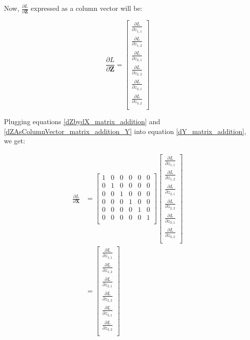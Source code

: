 \documentclass{article}
\newcommand{\matr}[1]{\mathbf{#1}} %
\begin{document}
Now, $\frac{\partial L}{\partial \matr{Z}}$ expressed as a column vector will be:

\begin{equation} \label{dZAsColumnVector_matrix_addition_Y}
\frac{\partial L}{\partial \matr{Z}} =
\begin{bmatrix}
\frac{\partial L}{\partial z_{1,1}} \\[0.7em]
\frac{\partial L}{\partial z_{1,2}} \\[0.7em]
\frac{\partial L}{\partial z_{2,1}} \\[0.7em]
\frac{\partial L}{\partial z_{2,2}} \\[0.7em]
\frac{\partial L}{\partial z_{3,1}} \\[0.7em]
\frac{\partial L}{\partial z_{3,2}} \\[0.7em]
\end{bmatrix}
\end{equation}

Plugging equations \ref{dZbydX_matrix_addition} and \ref{dZAsColumnVector_matrix_addition_Y} into equation \ref{dY_matrix_addition}, we get:

\begin{align}
\frac{\partial L}{\partial \matr{X}} &=
\begin{bmatrix}
1 & 0 & 0 & 0 & 0 & 0 \\%
0 & 1 & 0 & 0 & 0 & 0 \\%
0 & 0 & 1 & 0 & 0 & 0 \\%
0 & 0 & 0 & 1 & 0 & 0 \\%
0 & 0 & 0 & 0 & 1 & 0 \\%
0 & 0 & 0 & 0 & 0 & 1 \\%
\end{bmatrix}
\begin{bmatrix}
\frac{\partial L}{\partial z_{1,1}} \\[0.7em]
\frac{\partial L}{\partial z_{1,2}} \\[0.7em]
\frac{\partial L}{\partial z_{2,1}} \\[0.7em]
\frac{\partial L}{\partial z_{2,2}} \\[0.7em]
\frac{\partial L}{\partial z_{3,1}} \\[0.7em]
\frac{\partial L}{\partial z_{3,2}} \\[0.7em]
\end{bmatrix}
\nonumber \\
&=
\begin{bmatrix}
\frac{\partial L}{\partial z_{1,1}} \\[0.7em]
\frac{\partial L}{\partial z_{1,2}} \\[0.7em]
\frac{\partial L}{\partial z_{2,1}} \\[0.7em]
\frac{\partial L}{\partial z_{2,2}} \\[0.7em]
\frac{\partial L}{\partial z_{3,1}} \\[0.7em]
\frac{\partial L}{\partial z_{3,2}} \\[0.7em]
\end{bmatrix} \label{dYAsColumnVector_matrix_addition}
\end{align}
\end{document}
